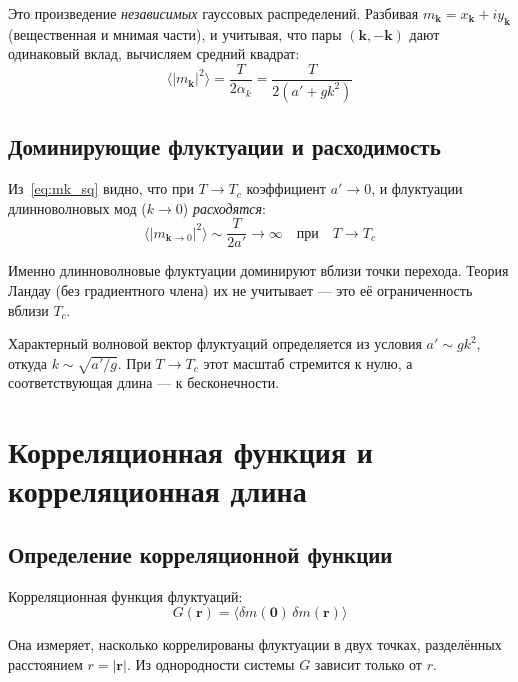 \documentclass[../general/general]{subfiles}
\begin{document}
Это произведение \emph{независимых} гауссовых распределений. Разбивая $m_\mathbf{k} = x_\mathbf{k} + iy_\mathbf{k}$ (вещественная и мнимая части), и учитывая, что пары $(\mathbf{k},-\mathbf{k})$ дают одинаковый вклад, вычисляем средний квадрат:
\begin{equation}
    \boxed{\langle|m_\mathbf{k}|^2\rangle = \frac{T}{2\alpha_k} = \frac{T}{2(a' + gk^2)}}
    \label{eq:mk_sq}
\end{equation}

\subsection{Доминирующие флуктуации и расходимость}

Из~\eqref{eq:mk_sq} видно, что при $T \to T_c$ коэффициент $a' \to 0$, и флуктуации длинноволновых мод ($k \to 0$) \emph{расходятся}:
\begin{equation}
    \langle|m_{\mathbf{k}\to 0}|^2\rangle \sim \frac{T}{2a'} \to \infty \quad \text{при} \quad T \to T_c
\end{equation}

Именно длинноволновые флуктуации доминируют вблизи точки перехода. Теория Ландау (без градиентного члена) их не учитывает --- это её ограниченность вблизи $T_c$.

Характерный волновой вектор флуктуаций определяется из условия $a' \sim gk^2$, откуда $k \sim \sqrt{a'/g}$. При $T \to T_c$ этот масштаб стремится к нулю, а соответствующая длина --- к бесконечности.


\section{Корреляционная функция и корреляционная длина}

\subsection{Определение корреляционной функции}

Корреляционная функция флуктуаций:
\begin{equation}
    G(\mathbf{r}) = \langle\delta m(\mathbf{0})\,\delta m(\mathbf{r})\rangle
\end{equation}

Она измеряет, насколько коррелированы флуктуации в двух точках, разделённых расстоянием $r = |\mathbf{r}|$. Из однородности системы $G$ зависит только от $r$.
\end{document}

